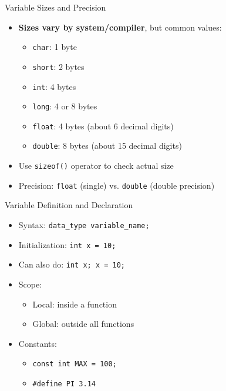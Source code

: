 \documentclass[12pt, aspectratio=169]{beamer}
\begin{document}
    \begin{frame}{Variable Sizes and Precision}
        \begin{itemize}
            \item \textbf{Sizes vary by system/compiler}, but common values:
                \begin{itemize}
                    \item \texttt{char}: 1 byte
                    \item \texttt{short}: 2 bytes
                    \item \texttt{int}: 4 bytes
                    \item \texttt{long}: 4 or 8 bytes
                    \item \texttt{float}: 4 bytes (about 6 decimal digits)
                    \item \texttt{double}: 8 bytes (about 15 decimal digits)
                \end{itemize}
            \item Use \texttt{sizeof()} operator to check actual size
            \item Precision: \texttt{float} (single) vs. \texttt{double} (double precision)
        \end{itemize}
    \end{frame}


    \begin{frame}{Variable Definition and Declaration}
        \begin{itemize}
            \item Syntax: \texttt{data\_type variable\_name;}
            \item Initialization: \texttt{int x = 10;}
            \item Can also do: \texttt{int x; x = 10;}
            \item Scope:
                \begin{itemize}
                    \item Local: inside a function
                    \item Global: outside all functions
                \end{itemize}
            \item Constants:
                \begin{itemize}
                    \item \texttt{const int MAX = 100;}
                    \item \texttt{\#define PI 3.14}
                \end{itemize}
        \end{itemize}
    \end{frame}
\end{document}
